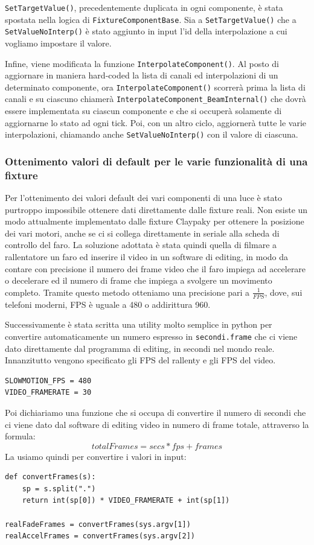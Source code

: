 \documentclass[main.tex]{subfiles}
\begin{document}
\lstinline{SetTargetValue()}, precedentemente duplicata in ogni componente, è stata spostata nella logica di \lstinline{FixtureComponentBase}. Sia a \lstinline{SetTargetValue()} che a \lstinline{SetValueNoInterp()} è stato aggiunto in input l'id della interpolazione a cui vogliamo impostare il valore. 

Infine, viene modificata la funzione \lstinline{InterpolateComponent()}. Al posto di aggiornare in maniera hard-coded la lista di canali ed interpolazioni di un determinato componente, ora \lstinline{InterpolateComponent()} scorrerà prima la lista di canali e su ciascuno chiamerà \lstinline{InterpolateComponent_BeamInternal()} che dovrà essere implementata su ciascun componente e che si occuperà solamente di aggiornarne lo stato ad ogni tick. Poi, con un altro ciclo, aggiornerà tutte le varie interpolazioni, chiamando anche \lstinline{SetValueNoInterp()} con il valore di ciascuna.

\clearpage
\subsubsection{Ottenimento valori di default per le varie funzionalità di una fixture}\label{subsec:3_1_defaultValues}
Per l'ottenimento dei valori default dei vari componenti di una luce è stato purtroppo impossibile ottenere dati direttamente dalle fixture reali. Non esiste un modo attualmente implementato dalle fixture Claypaky per ottenere la posizione dei vari motori, anche se ci si collega direttamente in seriale alla scheda di controllo del faro. La soluzione adottata è stata quindi quella di filmare a rallentatore un faro ed inserire il video in un software di editing, in modo da contare con precisione il numero dei frame video che il faro impiega ad accelerare o decelerare ed il numero di frame che impiega a svolgere un movimento completo. Tramite questo metodo otteniamo una precisione pari a $\frac{1}{FPS}$, dove, sui telefoni moderni, FPS è uguale a 480 o addirittura 960.\newline

Successivamente è stata scritta una utility molto semplice in python per convertire automaticamente un numero espresso in \lstinline{secondi.frame} che ci viene dato direttamente dal programma di editing, in secondi nel mondo reale. \newline
Innanzitutto vengono specificato gli FPS del rallenty e gli FPS del video.
\lstset{language=python}
\begin{lstlisting}
SLOWMOTION_FPS = 480
VIDEO_FRAMERATE = 30
\end{lstlisting}
Poi dichiariamo una funzione che si occupa di convertire il numero di secondi che ci viene dato dal software di editing video in numero di frame totale, attraverso la formula:
\[totalFrames = secs * fps + frames\]
La usiamo quindi per convertire i valori in input:
\begin{lstlisting}
def convertFrames(s):
    sp = s.split(".")
    return int(sp[0]) * VIDEO_FRAMERATE + int(sp[1])

realFadeFrames = convertFrames(sys.argv[1])
realAccelFrames = convertFrames(sys.argv[2])
\end{lstlisting}
\end{document}
